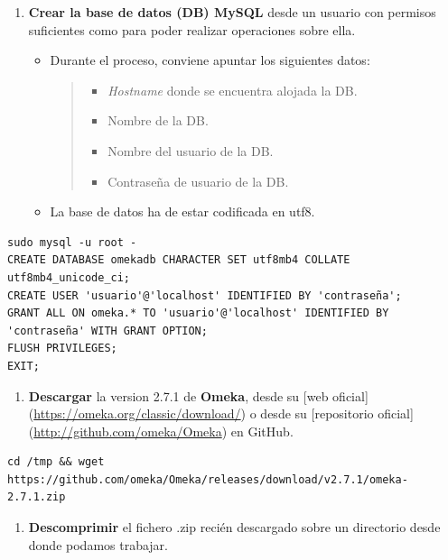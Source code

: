 \documentclass[
]{article}
\providecommand{\tightlist}{%
  \setlength{\itemsep}{0pt}\setlength{\parskip}{0pt}}
\begin{document}
\begin{enumerate}
\def\labelenumi{\arabic{enumi}.}
\tightlist
\item
  \textbf{Crear la base de datos (DB) MySQL} desde un usuario con
  permisos suficientes como para poder realizar operaciones sobre ella.

  \begin{itemize}
  \item
    Durante el proceso, conviene apuntar los siguientes datos:

    \begin{quote}
    \begin{itemize}
    \tightlist
    \item
      \emph{Hostname} donde se encuentra alojada la DB.
    \item
      Nombre de la DB.
    \item
      Nombre del usuario de la DB.
    \item
      Contraseña de usuario de la DB.
    \end{itemize}
    \end{quote}
  \item
    La base de datos ha de estar codificada en {utf8}.
  \end{itemize}
\end{enumerate}

\begin{verbatim}
sudo mysql -u root -
CREATE DATABASE omekadb CHARACTER SET utf8mb4 COLLATE utf8mb4_unicode_ci;
CREATE USER 'usuario'@'localhost' IDENTIFIED BY 'contraseña';
GRANT ALL ON omeka.* TO 'usuario'@'localhost' IDENTIFIED BY 'contraseña' WITH GRANT OPTION;
FLUSH PRIVILEGES;
EXIT;
\end{verbatim}

\begin{enumerate}
\def\labelenumi{\arabic{enumi}.}
\setcounter{enumi}{1}
\tightlist
\item
  \textbf{Descargar} la version 2.7.1 de \textbf{Omeka}, desde su {[}web
  oficial{]}(\url{https://omeka.org/classic/download/}) o desde su
  {[}repositorio oficial{]}(\url{http://github.com/omeka/Omeka}) en
  GitHub.
\end{enumerate}

\begin{verbatim}
cd /tmp && wget https://github.com/omeka/Omeka/releases/download/v2.7.1/omeka-2.7.1.zip
\end{verbatim}

\begin{enumerate}
\def\labelenumi{\arabic{enumi}.}
\setcounter{enumi}{2}
\tightlist
\item
  \textbf{Descomprimir} el fichero {.zip} recién descargado sobre un
  directorio desde donde podamos trabajar.
\end{enumerate}
\end{document}
